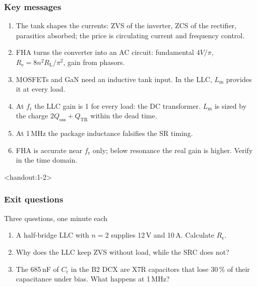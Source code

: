 \begin{frame}
	\frametitle{Key messages}
	\begin{enumerate}
		\item The tank shapes the currents: ZVS of the inverter, ZCS of the rectifier, parasitics absorbed; the price is circulating current and frequency control.
		\item FHA turns the converter into an AC circuit: fundamental $4V/\pi$, $R_\mathrm{e}=8n^2R_\mathrm{L}/\pi^2$, gain from phasors.
		\item MOSFETs and GaN need an inductive tank input. In the LLC, $L_\mathrm{m}$ provides it at every load.
		\item At $f_\mathrm{r}$ the LLC gain is 1 for every load: the DC transformer. $L_\mathrm{m}$ is sized by the charge $2Q_\mathrm{oss}+Q_\mathrm{TR}$ within the dead time.
		\item At 1\,MHz the package inductance falsifies the SR timing.
		\item FHA is accurate near $f_\mathrm{r}$ only; below resonance the real gain is higher. Verify in the time domain.
	\end{enumerate}
\end{frame}

\begin{frame}<handout:1-2>
	\frametitle{Exit questions}
	\begin{varblock}[\textwidth]{Three questions, one minute each}
		\begin{enumerate}
			\item A half-bridge LLC with $n=2$ supplies 12\,V and 10\,A. Calculate $R_\mathrm{e}$.
			\item Why does the LLC keep ZVS without load, while the SRC does not?
			\item The 685\,nF of $C_\mathrm{r}$ in the B2 DCX are X7R capacitors that lose 30\,\% of their capacitance under bias. What happens at 1\,MHz?
		\end{enumerate}
	\end{varblock}
\end{frame}

